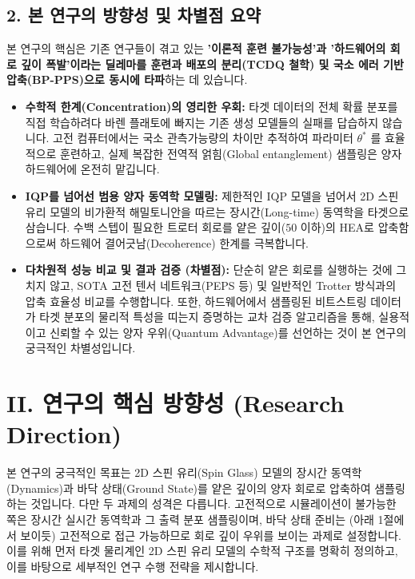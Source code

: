 \documentclass[11pt,a4paper]{article}
\begin{document}
\subsection*{2. 본 연구의 방향성 및 차별점 요약}

본 연구의 핵심은 기존 연구들이 겪고 있는 \textbf{'이론적 훈련 불가능성'과 '하드웨어의 회로 깊이 폭발'이라는 딜레마를 훈련과 배포의 분리(TCDQ 철학) 및 국소 에러 기반 압축(BP-PPS)으로 동시에 타파}하는 데 있습니다.

\begin{itemize}
    \item \textbf{수학적 한계(Concentration)의 영리한 우회:} 타겟 데이터의 전체 확률 분포를 직접 학습하려다 바렌 플래토에 빠지는 기존 생성 모델들의 실패를 답습하지 않습니다. 고전 컴퓨터에서는 국소 관측가능량의 차이만 추적하여 파라미터 $\theta^*$ 를 효율적으로 훈련하고, 실제 복잡한 전역적 얽힘(Global entanglement) 샘플링은 양자 하드웨어에 온전히 맡깁니다.
    \item \textbf{IQP를 넘어선 범용 양자 동역학 모델링:} 제한적인 IQP 모델을 넘어서 2D 스핀 유리 모델의 비가환적 해밀토니안을 따르는 장시간(Long-time) 동역학을 타겟으로 삼습니다. 수백 스텝이 필요한 트로터 회로를 얕은 깊이($50$ 이하)의 HEA로 압축함으로써 하드웨어 결어긋남(Decoherence) 한계를 극복합니다.
    \item \textbf{다차원적 성능 비교 및 결과 검증 (차별점):} 단순히 얕은 회로를 실행하는 것에 그치지 않고, SOTA 고전 텐서 네트워크(PEPS 등) 및 일반적인 Trotter 방식과의 압축 효율성 비교를 수행합니다. 또한, 하드웨어에서 샘플링된 비트스트링 데이터가 타겟 분포의 물리적 특성을 띠는지 증명하는 교차 검증 알고리즘을 통해, 실용적이고 신뢰할 수 있는 양자 우위(Quantum Advantage)를 선언하는 것이 본 연구의 궁극적인 차별성입니다.
\end{itemize}

\vspace{0.6em}
\section*{II. 연구의 핵심 방향성 (Research Direction)}

본 연구의 궁극적인 목표는 2D 스핀 유리(Spin Glass) 모델의 장시간 동역학(Dynamics)과 바닥 상태(Ground State)를 얕은 깊이의 양자 회로로 압축하여 샘플링하는 것입니다. 다만 두 과제의 성격은 다릅니다. 고전적으로 시뮬레이션이 불가능한 쪽은 장시간 실시간 동역학과 그 출력 분포 샘플링이며, 바닥 상태 준비는 (아래 1절에서 보이듯) 고전적으로 접근 가능하므로 회로 깊이 우위를 보이는 과제로 설정합니다. 이를 위해 먼저 타겟 물리계인 2D 스핀 유리 모델의 수학적 구조를 명확히 정의하고, 이를 바탕으로 세부적인 연구 수행 전략을 제시합니다.
\end{document}
